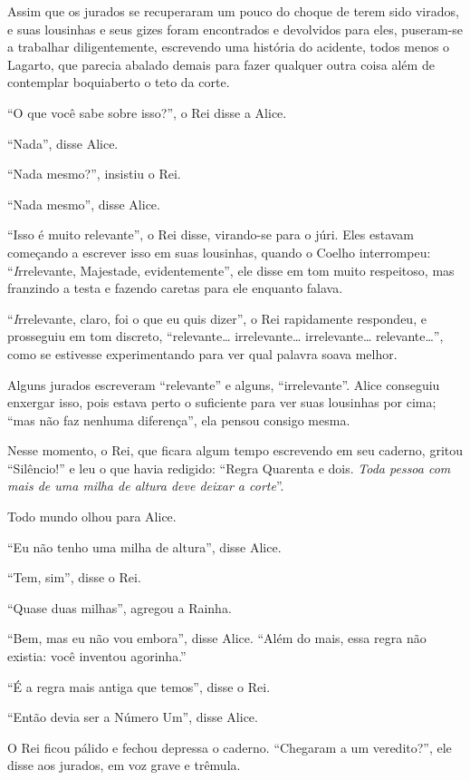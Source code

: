 Assim que os jurados se recuperaram um pouco do choque de terem sido
virados, e suas lousinhas e seus gizes foram encontrados e devolvidos
para eles, puseram-se a trabalhar diligentemente, escrevendo uma
história do acidente, todos menos o Lagarto, que parecia abalado demais
para fazer qualquer outra coisa além de contemplar boquiaberto o teto da
corte.

``O que você sabe sobre isso?'', o Rei disse a Alice.

``Nada'', disse Alice.

``Nada mesmo?'', insistiu o Rei.

``Nada mesmo'', disse Alice.

``Isso é muito relevante'', o Rei disse, virando-se para o júri. Eles
estavam começando a escrever isso em suas lousinhas, quando o Coelho
interrompeu: ``\emph{I}rrelevante, Majestade, evidentemente'', ele disse
em tom muito respeitoso, mas franzindo a testa e fazendo caretas para
ele enquanto falava.

``\emph{I}rrelevante, claro, foi o que eu quis dizer'', o Rei
rapidamente respondeu, e prosseguiu em tom discreto, ``relevante\ldots{}
irrelevante\ldots{} irrelevante\ldots{} relevante\ldots{}'', como se estivesse
experimentando para ver qual palavra soava melhor.

Alguns jurados escreveram ``relevante'' e alguns, ``irrelevante''. Alice
conseguiu enxergar isso, pois estava perto o suficiente para ver suas
lousinhas por cima; ``mas não faz nenhuma diferença'', ela pensou
consigo mesma.

Nesse momento, o Rei, que ficara algum tempo escrevendo em seu caderno,
gritou ``Silêncio!'' e leu o que havia redigido: ``Regra Quarenta e
dois. \emph{Toda pessoa com mais de uma milha de altura deve deixar a
corte}''.

Todo mundo olhou para Alice.

``Eu não tenho uma milha de altura'', disse Alice.

``Tem, sim'', disse o Rei.

``Quase duas milhas'', agregou a Rainha.

``Bem, mas eu não vou embora'', disse Alice. ``Além do mais, essa regra
não existia: você inventou agorinha.''

``É a regra mais antiga que temos'', disse o Rei.

``Então devia ser a Número Um'', disse Alice.

O Rei ficou pálido e fechou depressa o caderno. ``Chegaram a um
veredito?'', ele disse aos jurados, em voz grave e trêmula.

